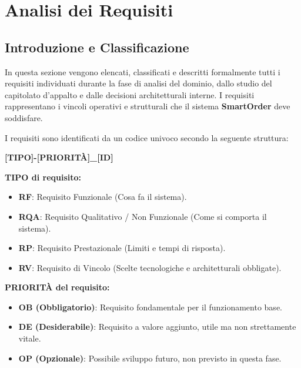 \newpage
\section{Analisi dei Requisiti}

\subsection{Introduzione e Classificazione}
In questa sezione vengono elencati, classificati e descritti formalmente tutti i requisiti individuati durante la fase di analisi del dominio, dallo studio del capitolato d'appalto e dalle decisioni architetturali interne. I requisiti rappresentano i vincoli operativi e strutturali che il sistema \textbf{SmartOrder} deve soddisfare.

I requisiti sono identificati da un codice univoco secondo la seguente struttura:
\begin{center}
    \textbf{[TIPO]-[PRIORITÀ]\_[ID]}
\end{center}

\textbf{TIPO di requisito:}
\begin{itemize}
    \item \textbf{RF}: Requisito Funzionale (Cosa fa il sistema).
    \item \textbf{RQA}: Requisito Qualitativo / Non Funzionale (Come si comporta il sistema).
    \item \textbf{RP}: Requisito Prestazionale (Limiti e tempi di risposta).
    \item \textbf{RV}: Requisito di Vincolo (Scelte tecnologiche e architetturali obbligate).
\end{itemize}

\textbf{PRIORITÀ del requisito:}
\begin{itemize}
    \item \textbf{OB (Obbligatorio)}: Requisito fondamentale per il funzionamento base.
    \item \textbf{DE (Desiderabile)}: Requisito a valore aggiunto, utile ma non strettamente vitale.
    \item \textbf{OP (Opzionale)}: Possibile sviluppo futuro, non previsto in questa fase.
\end{itemize}

\newpage
